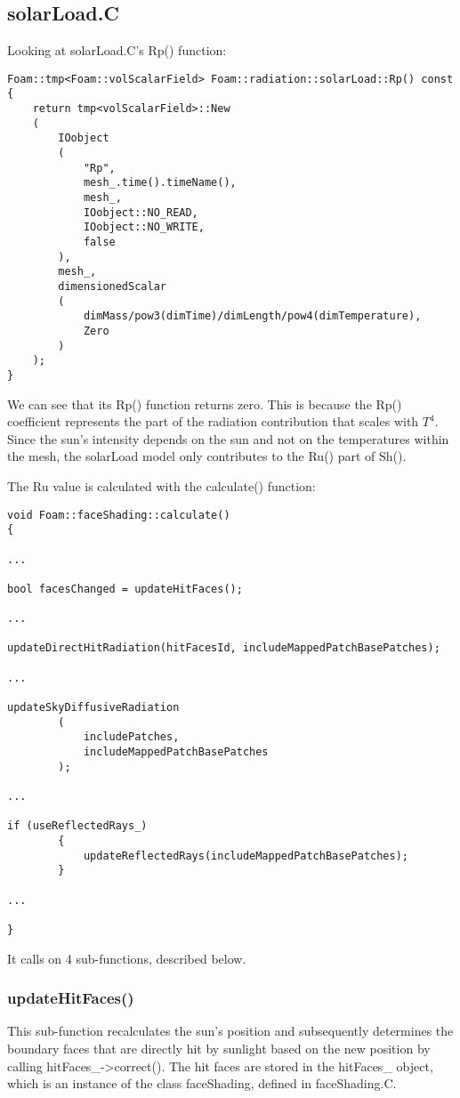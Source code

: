 \subsection{solarLoad.C}

Looking at solarLoad.C's Rp() function:

\begin{verbatim}
Foam::tmp<Foam::volScalarField> Foam::radiation::solarLoad::Rp() const
{
    return tmp<volScalarField>::New
    (
        IOobject
        (
            "Rp",
            mesh_.time().timeName(),
            mesh_,
            IOobject::NO_READ,
            IOobject::NO_WRITE,
            false
        ),
        mesh_,
        dimensionedScalar
        (
            dimMass/pow3(dimTime)/dimLength/pow4(dimTemperature),
            Zero
        )
    );
}
\end{verbatim}
We can see that its Rp() function returns zero. This is because the Rp() coefficient represents the part of the radiation contribution that scales with $T^4$. Since the sun's intensity depends on the sun and not on the temperatures within the mesh, the solarLoad model only contributes to the Ru() part of Sh().

The Ru value is calculated with the calculate() function:
\begin{verbatim}
void Foam::faceShading::calculate()
{

...

bool facesChanged = updateHitFaces();

...

updateDirectHitRadiation(hitFacesId, includeMappedPatchBasePatches);

...

updateSkyDiffusiveRadiation
        (
            includePatches,
            includeMappedPatchBasePatches
        );

...

if (useReflectedRays_)
        {
            updateReflectedRays(includeMappedPatchBasePatches);
        }
        
...

}
\end{verbatim}

It calls on 4 sub-functions, described below.

\subsubsection{updateHitFaces()}

This sub-function recalculates the sun's position and subsequently determines the boundary faces that are directly hit by sunlight based on the new position by calling hitFaces\_->correct(). The hit faces are stored in the hitFaces\_ object, which is an instance of the class faceShading, defined in faceShading.C.

